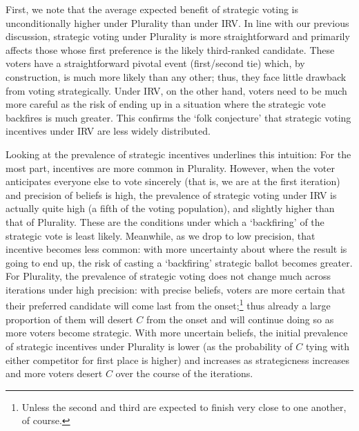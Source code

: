 \documentclass[12pt, letter]{article}
\begin{document}
First, we note that the average expected benefit of strategic voting is unconditionally higher under Plurality than under IRV. In line with our previous discussion, strategic voting under Plurality is more straightforward and primarily affects those whose first preference is the likely third-ranked candidate. These voters have a straightforward pivotal event (first/second tie) which, by construction, is much more likely than any other; thus, they face little drawback from voting strategically. Under IRV, on the other hand, voters need to be much more careful as the risk of ending up in a situation where the strategic vote backfires is much greater. This confirms the `folk conjecture' that strategic voting incentives under IRV are less widely distributed.

Looking at the prevalence of strategic incentives underlines this intuition: For the most part, incentives are more common in Plurality. However, when the voter anticipates everyone else to vote sincerely (that is, we are at the first iteration) and precision of beliefs is high, the prevalence of strategic voting under IRV is actually quite high (a fifth of the voting population), and slightly higher than that of Plurality. These are the conditions under which a `backfiring' of the strategic vote is least likely. Meanwhile, as we drop to low precision, that incentive becomes less common: with more uncertainty about where the result is going to end up, the risk of casting a `backfiring' strategic ballot becomes greater. For Plurality, the prevalence of strategic voting does not change much across iterations under high precision: with precise beliefs, voters are more certain that their preferred candidate will come last from the onset;\footnote{Unless the second and third are expected to finish very close to one another, of course.} thus already a large proportion of them will desert $C$ from the onset and will continue doing so as more voters become strategic. With more uncertain beliefs, the initial prevalence of strategic incentives under Plurality is lower (as the probability of $C$ tying with either competitor for first place is higher) and increases as strategicness increases and more voters desert $C$ over the course of the iterations.
\end{document}
